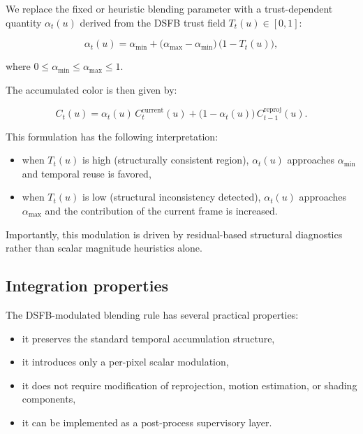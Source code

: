 \documentclass[11pt]{article}
\theoremstyle{definition}
\theoremstyle{plain}
\begin{document}
We replace the fixed or heuristic blending parameter with a trust-dependent quantity $\alpha_t(u)$ derived from the DSFB trust field $T_t(u) \in [0,1]$:

\begin{equation}
\alpha_t(u) = \alpha_{\min} 
+ \bigl(\alpha_{\max} - \alpha_{\min}\bigr)\,\bigl(1 - T_t(u)\bigr),
\end{equation}

where $0 \leq \alpha_{\min} \leq \alpha_{\max} \leq 1$.

The accumulated color is then given by:

\begin{equation}
C_t(u) = \alpha_t(u) \, C_t^{\mathrm{current}}(u)
+ \bigl(1 - \alpha_t(u)\bigr)\, C_{t-1}^{\mathrm{reproj}}(u).
\end{equation}

This formulation has the following interpretation:

\begin{itemize}[leftmargin=1.5em]
    \item when $T_t(u)$ is high (structurally consistent region), $\alpha_t(u)$ approaches $\alpha_{\min}$ and temporal reuse is favored,
    \item when $T_t(u)$ is low (structural inconsistency detected), $\alpha_t(u)$ approaches $\alpha_{\max}$ and the contribution of the current frame is increased.
\end{itemize}

Importantly, this modulation is driven by residual-based structural diagnostics rather than scalar magnitude heuristics alone.


\subsection{Integration properties}

The DSFB-modulated blending rule has several practical properties:

\begin{itemize}[leftmargin=1.5em]
    \item it preserves the standard temporal accumulation structure,
    \item it introduces only a per-pixel scalar modulation,
    \item it does not require modification of reprojection, motion estimation, or shading components,
    \item it can be implemented as a post-process supervisory layer.
\end{itemize}
\end{document}
